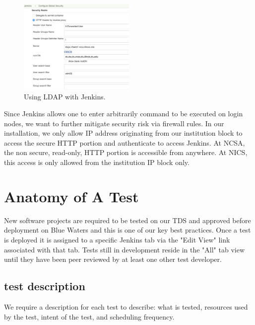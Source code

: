\documentclass[10pt, conference, compsocconf]{IEEEtran}
\begin{document}
{\begin{figure}
\centering
\includegraphics[width=0.5\textwidth]{LDAP-Jenkins}
\caption{Using LDAP with Jenkins.}
\label{fig:LDAP-Jenkins}
\end{figure}

Since Jenkins allows one to enter arbitrarily command to be executed on login nodes, we want to further mitigate security risk via firewall rules. 
In our installation, we only allow IP address originating from our institution block to access the secure HTTP portion and authenticate to access Jenkins. 
At NCSA, the non secure, read-only, HTTP portion is accessible from anywhere. 
At NICS, this access is only allowed from the institution IP block only. 


\section{Anatomy of A Test}
\label{sec:TestAnatomy}
New software projects are required to be tested on our TDS and approved before deployment on Blue Waters and this is one of our key best practices. 
 Once a test is deployed it is assigned to a specific Jenkins tab via the "Edit View" link associated with that tab. 
 Tests still in development reside in the "All" tab view until they have been peer reviewed by at least one other test developer.
\subsection{test description}
We require a description for each test to describe: what is tested, resources used by the test, intent of the test, and scheduling frequency.
}
\end{document}
